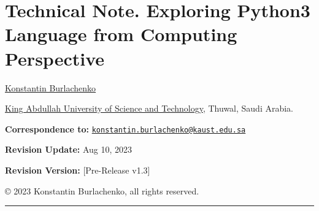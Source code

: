 \documentclass[
]{article}
\author{}
\date{}
\begin{document}
\hypertarget{technical-note-exploring-python3-language-from-computing-perspective}{%
\section{\texorpdfstring{Technical Note. Exploring Python3 Language from
Computing Perspective
}{Technical Note. Exploring Python3 Language from Computing Perspective }}\label{technical-note-exploring-python3-language-from-computing-perspective}}

\href{https://burlachenkok.github.io/}{Konstantin Burlachenko}

\href{https://www.kaust.edu.sa/en}{King Abdullah University of Science
and Technology}, Thuwal, Saudi Arabia.

\textbf{Correspondence to:}
\href{mailto:konstantin.burlachenko@kaust.edu.sa}{\nolinkurl{konstantin.burlachenko@kaust.edu.sa}}

\textbf{Revision Update:} Aug 10, 2023

\textbf{Revision Version:} {[}Pre-Release v1.3{]}

© 2023 Konstantin Burlachenko, all rights reserved.

\begin{center}\rule{0.5\linewidth}{0.5pt}\end{center}
\end{document}
